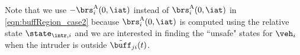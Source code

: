 Note that we use $-\brs^{\text{A}}_{i}(0, \iat)$ instead of $\brs^{\text{A}}_{i}(0, \iat)$ in \eqref{eqn:buffRegion_case2} because $\brs^{\text{A}}_{i}(0, \iat)$ is computed using the relative state $\state_{\intr, i}$ and we are interested in finding the ``unsafe" states for $\veh_i$ when the intruder is outside $\tilde{\buff}_{ji}(t)$.
